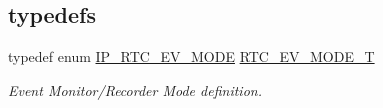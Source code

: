\subsection*{\textquotesingle{}typedefs\textquotesingle{}}
\begin{DoxyCompactItemize}
\item 
typedef enum \hyperlink{group___r_t_c__18_x_x__43_x_x_gaefde431348a2ce3d7721a63780e9d9ba}{I\+P\+\_\+\+R\+T\+C\+\_\+\+E\+V\+\_\+\+M\+O\+DE} \hyperlink{group___r_t_c__18_x_x__43_x_x_gabcbfff4a7d52791dc0b1cdcb078a2a05}{R\+T\+C\+\_\+\+E\+V\+\_\+\+M\+O\+D\+E\+\_\+T}
\begin{DoxyCompactList}\small\item\em Event Monitor/\+Recorder Mode definition. \end{DoxyCompactList}\end{DoxyCompactItemize}
